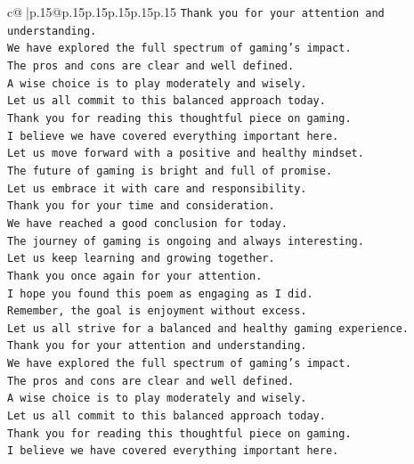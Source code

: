 \documentclass{article}
\begin{document}
{\begin{supertabular}{c@{$\;$}|p{.15\linewidth}@{}p{.15\linewidth}p{.15\linewidth}p{.15\linewidth}p{.15\linewidth}p{.15\linewidth}}
{{{\texttt{Thank you for your attention and understanding.  } \\
\texttt{We have explored the full spectrum of gaming's impact.  } \\
\texttt{The pros and cons are clear and well defined.  } \\
\texttt{A wise choice is to play moderately and wisely.  } \\
\texttt{Let us all commit to this balanced approach today.  } \\
\texttt{Thank you for reading this thoughtful piece on gaming.  } \\
\texttt{I believe we have covered everything important here.  } \\
\texttt{Let us move forward with a positive and healthy mindset.  } \\
\texttt{The future of gaming is bright and full of promise.  } \\
\texttt{Let us embrace it with care and responsibility.  } \\
\texttt{Thank you for your time and consideration.  } \\
\texttt{We have reached a good conclusion for today.  } \\
\texttt{The journey of gaming is ongoing and always interesting.  } \\
\texttt{Let us keep learning and growing together.  } \\
\texttt{Thank you once again for your attention.  } \\
\texttt{I hope you found this poem as engaging as I did.  } \\
\texttt{Remember, the goal is enjoyment without excess.  } \\
\texttt{Let us all strive for a balanced and healthy gaming experience.  } \\
\texttt{Thank you for your attention and understanding.  } \\
\texttt{We have explored the full spectrum of gaming's impact.  } \\
\texttt{The pros and cons are clear and well defined.  } \\
\texttt{A wise choice is to play moderately and wisely.  } \\
\texttt{Let us all commit to this balanced approach today.  } \\
\texttt{Thank you for reading this thoughtful piece on gaming.  } \\
\texttt{I believe we have covered everything important here.  } \\
}}}
\end{supertabular}}
\end{document}
